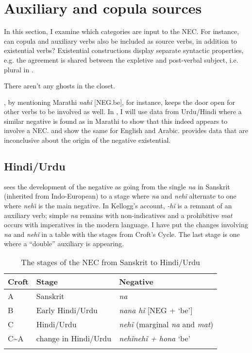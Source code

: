 \documentclass[output=paper,draft,draftmode,colorlinks,citecolor=brown]{langscibook}
\begin{document}
\section{Auxiliary and copula sources}\label{sec:oth-2}

In this section, I examine which categories are input to the NEC. For
instance, can copula and auxiliary verbs also be included as source verbs,
in addition to existential verbs? Existential constructions display
separate syntactic properties, e.g. the agreement is shared between the
expletive and post-verbal subject, i.e. plural in
.
%
\begin{exe}\ex
    \label{ex:other-ghosts}
          There aren't any ghosts in the closet.
    \end{exe}
%
\citet[12]{Croft1991}, by mentioning Marathi
\textit{nahĩ} [NEG.be], for instance, keeps the door open for other verbs
to be involved as well. In , I will use data from
Urdu\slash Hindi where a similar negative is found as in Marathi to show
that this indeed appears to involve a NEC.  and
 show the same for English and
Arabic.  provides data that are
inconclusive about the origin of the negative existential.

\subsection{Hindi\slash Urdu}\label{sec:oth-2.1}

\citet{Kellogg1938} sees the development of the negative as going from the
single \textit{na} in Sanskrit (inherited from Indo-European) to a stage
where \textit{na} and \textit{nehĩ} alternate to one where
\textit{neh\~\i} is the main negative. In Kellogg's account,
\textit{-hĩ} is a remnant of an auxiliary verb; simple \textit{na}
remains with non-indicatives and a prohibitive \textit{mat} occurs with
imperatives in the modern language. I have put the changes involving
\textit{na} and \textit{nehĩ} in a table with the stages from Croft's
Cycle. The last stage is one where a ``double'' auxiliary is
appearing.

\begin{table}
\caption{The stages of the NEC from Sanskrit to  Hindi\slash Urdu}
\label{tab:oth-Sanskrit}
\begin{tabular}{lll}
\lsptoprule
Croft    &  Stage & Negative\\\midrule
A               &Sanskrit           &\textit{na}\\
B               &Early Hindi\slash Urdu  &\textit{na}\hspace{1cm}\textit{na
hĩ} [NEG + `be']\\ 
C               &Hindi\slash Urdu         &\textit{nehĩ}  (marginal \textit{na}
and \textit{mat})\\
C{\textasciitilde}A    &change in Hindi\slash Urdu
&\textit{nehĩ}\hspace{1cm}\textit{nehĩ + hona} `be'\\
\lspbottomrule
\end{tabular}
\end{table}
\end{document}
